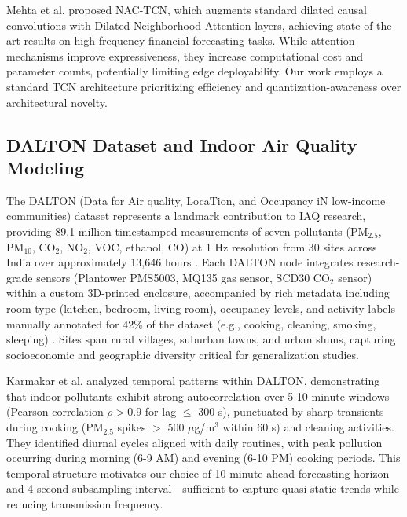 Mehta et al. \cite{mehta2023nactcn} proposed NAC-TCN, which augments standard dilated causal convolutions with Dilated Neighborhood Attention layers, achieving state-of-the-art results on high-frequency financial forecasting tasks. While attention mechanisms improve expressiveness, they increase computational cost and parameter counts, potentially limiting edge deployability. Our work employs a standard TCN architecture prioritizing efficiency and quantization-awareness over architectural novelty.

\subsection{DALTON Dataset and Indoor Air Quality Modeling}

The DALTON (Data for Air quality, LocaTion, and Occupancy iN low-income communities) dataset represents a landmark contribution to IAQ research, providing 89.1 million timestamped measurements of seven pollutants (PM$_{2.5}$, PM$_{10}$, CO$_2$, NO$_2$, VOC, ethanol, CO) at 1 Hz resolution from 30 sites across India over approximately 13,646 hours \cite{karmakar2024indoor}. Each DALTON node integrates research-grade sensors (Plantower PMS5003, MQ135 gas sensor, SCD30 CO$_2$ sensor) within a custom 3D-printed enclosure, accompanied by rich metadata including room type (kitchen, bedroom, living room), occupancy levels, and activity labels manually annotated for 42\% of the dataset (e.g., cooking, cleaning, smoking, sleeping) \cite{karmakar2024exploring}. Sites span rural villages, suburban towns, and urban slums, capturing socioeconomic and geographic diversity critical for generalization studies.

Karmakar et al. \cite{karmakar2024exploring} analyzed temporal patterns within DALTON, demonstrating that indoor pollutants exhibit strong autocorrelation over 5-10 minute windows (Pearson correlation $\rho > 0.9$ for lag $\leq$ 300 s), punctuated by sharp transients during cooking (PM$_{2.5}$ spikes $>$ 500 $\mu$g/m$^3$ within 60 s) and cleaning activities. They identified diurnal cycles aligned with daily routines, with peak pollution occurring during morning (6-9 AM) and evening (6-10 PM) cooking periods. This temporal structure motivates our choice of 10-minute ahead forecasting horizon and 4-second subsampling interval—sufficient to capture quasi-static trends while reducing transmission frequency.

